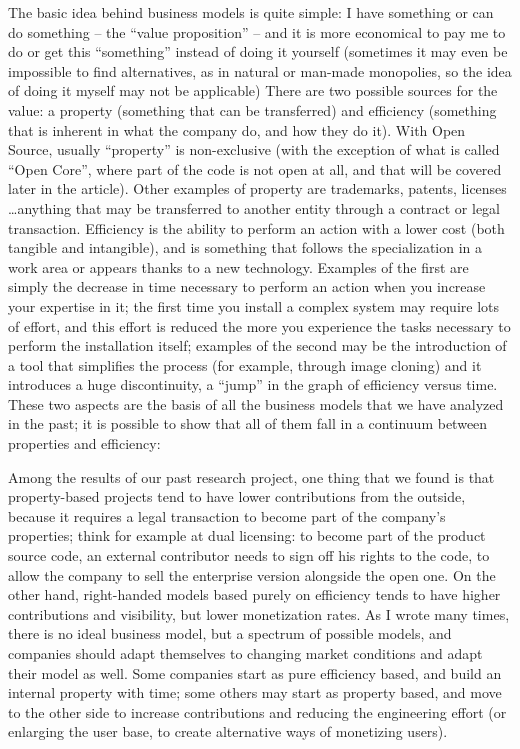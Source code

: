 The basic idea behind business models is quite simple: I have something or can do something – the “value proposition” -- and it is more economical to pay me to do or get this “something” instead of doing it yourself (sometimes it may even be impossible to find alternatives, as in natural or man-made monopolies, so the idea of doing it myself may not be applicable)
There are two possible sources for the value: a property (something that can be transferred) and efficiency (something that is inherent in what the company do, and how they do it). With Open Source, usually “property” is non-exclusive (with the exception of what is called “Open Core”, where part of the code is not open at all, and that will be covered later in the article). Other examples of property are trademarks, patents, licenses \dots anything that may be transferred to another entity through a contract or legal transaction.
Efficiency is the ability to perform an action with a lower cost (both tangible and intangible), and is something that follows the specialization in a work area or appears thanks to a new technology. Examples of the first are simply the decrease in time necessary to perform an action when you increase your expertise in it; the first time you install a complex system may require lots of effort, and this effort is reduced the more you experience the tasks necessary to perform the installation itself; examples of the second may be the introduction of a tool that simplifies the process (for example, through image cloning) and it introduces a huge discontinuity, a “jump” in the graph of efficiency versus time.
These two aspects are the basis of all the business models that we have analyzed in the past; it is possible to show that all of them fall in a continuum between properties and efficiency:

Among the results of our past research project, one thing that we found is that property-based projects tend to have lower contributions from the outside, because it requires a legal transaction to become part of the company’s properties; think for example at dual licensing: to become part of the product source code, an external contributor needs to sign off his rights to the code, to allow the company to sell the enterprise version alongside the open one.
On the other hand, right-handed models based purely on efficiency tends to have higher contributions and visibility, but lower monetization rates. As I wrote many times, there is no ideal business model, but a spectrum of possible models, and companies should adapt themselves to changing market conditions and adapt their model as well. Some companies start as pure efficiency based, and build an internal property with time; some others may start as property based, and move to the other side to increase contributions and reducing the engineering effort (or enlarging the user base, to create alternative ways of monetizing users).

